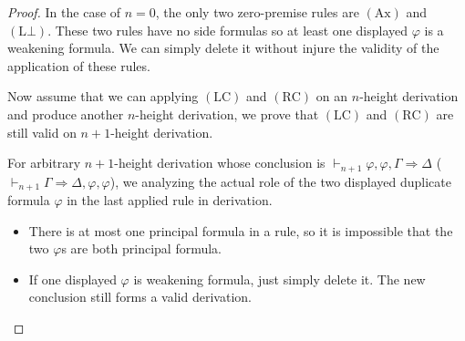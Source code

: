 \documentclass[12pt]{article}
\newcommand\A{\varphi}
\newcommand\GG\Gamma
\newcommand\D\Delta
\newcommand\TO\Rightarrow
\newcommand\AX{\textrm{Ax}}
\newcommand\LB{\textrm{L$\bot$}}
\newcommand\LC{\textrm{LC}}
\newcommand\RC{\textrm{RC}}
\begin{document}
\begin{enumerate}
\begin{proof}
            In the case of $n=0$, the only two zero-premise rules are $(\AX)$ and $(\LB)$. These two rules have no side formulas so at least one displayed $\A$ is a weakening formula. We can simply delete it without injure the validity of the application of these rules.
            
            Now assume that we can applying $(\LC)$ and $(\RC)$ on an $n$-height derivation and produce another $n$-height derivation, we prove that $(\LC)$ and $(\RC)$ are still valid on $n+1$-height derivation.
            
            For arbitrary $n+1$-height derivation whose conclusion is $\vdash_{n+1}\A,\A,\GG\TO\D$ ($\vdash_{n+1}\GG\TO\D,\A,\A$), we analyzing the actual role of the two displayed duplicate formula $\A$ in the last applied rule in derivation.
            \begin{itemize}
                \item There is at most one principal formula in a rule, so it is impossible that the two $\A$s are both principal formula.
                
                \item If one displayed $\A$ is weakening formula, just simply delete it. The new conclusion still forms a valid derivation.
                

\end{itemize}
\end{proof}
\end{enumerate}
\end{document}
